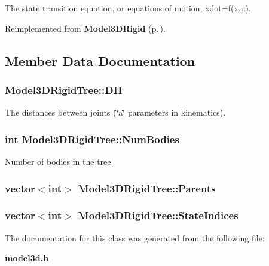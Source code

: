 The state transition equation, or equations of motion, xdot=f(x,u).



Reimplemented from {\bf Model3DRigid} {\rm (p.\,\pageref{class_Model3DRigid_a3})}.

\subsection{Member Data Documentation}
\subsubsection{ Model3DRigid\-Tree::DH}\label{class_Model3DRigidTree_m1}


The distances between joints (\char`\"{}a\char`\"{} parameters in kinematics).

\subsubsection{\setlength{\rightskip}{0pt plus 5cm}int Model3DRigid\-Tree::Num\-Bodies}\label{class_Model3DRigidTree_m0}


Number of bodies in the tree.

\subsubsection{\setlength{\rightskip}{0pt plus 5cm}vector$<$int$>$ Model3DRigid\-Tree::Parents}\label{class_Model3DRigidTree_m3}


\subsubsection{\setlength{\rightskip}{0pt plus 5cm}vector$<$int$>$ Model3DRigid\-Tree::State\-Indices}\label{class_Model3DRigidTree_m2}




The documentation for this class was generated from the following file:\begin{CompactItemize}
\item 
{\bf model3d.h}\end{CompactItemize}
